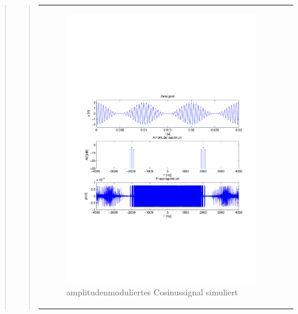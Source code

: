 \begin{quote}
\begin{quote}
\begin{center}
\begin{tabular}{ll}
\begin{minipage}{0.6\textwidth}
                    \begin{figure}[H]
                        \label{fig:}
                        \includegraphics[scale=0.5, trim = 2cm 6.5cm 1.5cm
                        8.5cm, clip]{./Bilder/Cosinusmodsimuliert} %
                        \caption{amplitudenmoduliertes Cosinussignal simuliert}
                    \end{figure}

                \end{minipage}
                \begin{minipage}{0.6\textwidth}


\end{minipage}
\end{tabular}
\end{center}
\end{quote}
\end{quote}
